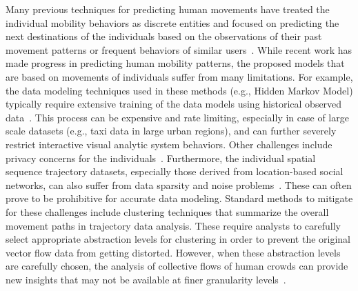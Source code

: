 Many previous techniques for predicting human movements have treated the individual mobility behaviors as discrete entities and focused on predicting the next destinations of the individuals based on the observations of their past movement patterns or frequent behaviors of similar users~\cite{Monreale:2009:Wherenext,Xue:2013:Destination,Ying:2011:Semantic}.
While recent work has made progress in predicting human mobility patterns, the proposed models that are based on movements of individuals suffer from many limitations.
For example, the data modeling techniques used in these methods (e.g., Hidden Markov Model) typically require extensive training of the data models using historical observed data~\cite{Mathew:2012:Predicting,Xue:2013:Destination}. 
This process can be expensive and rate limiting, especially in case of large scale datasets (e.g., taxi data in large urban regions), and can further severely restrict interactive visual analytic system behaviors.
Other 
challenges 
include privacy concerns for the individuals~\cite{Monreale:2010:Movement,Xue:2013:Destination}.
Furthermore, the individual spatial sequence trajectory datasets, especially those derived from location-based social networks, can also suffer from data sparsity and noise problems~\cite{Wei:2012:Constructing,Wang:2014:Visual}.
These can often prove to be prohibitive for accurate data modeling.
Standard methods to mitigate for these challenges include clustering techniques that summarize the overall movement paths in trajectory data analysis.
These require analysts to carefully select appropriate abstraction levels for clustering in order to prevent the original vector flow data from getting distorted. 
However, when these abstraction levels are carefully chosen, the analysis of collective flows of human crowds can provide new insights that may not be available at finer granularity levels~\cite{Andrienko:2013:Visual, Hughes:2003:Flow}.

